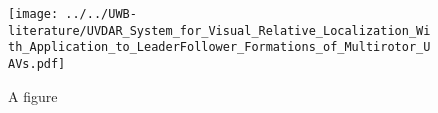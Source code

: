 \documentclass{article}
\begin{document}
\lipsum[1]
\begin{figure}
    \texttt{[image: ../../UWB-literature/UVDAR\_System\_for\_Visual\_Relative\_Localization\_With\_Application\_to\_LeaderFollower\_Formations\_of\_Multirotor\_UAVs.pdf]}\caption{A figure}
\end{figure}
\end{document}
